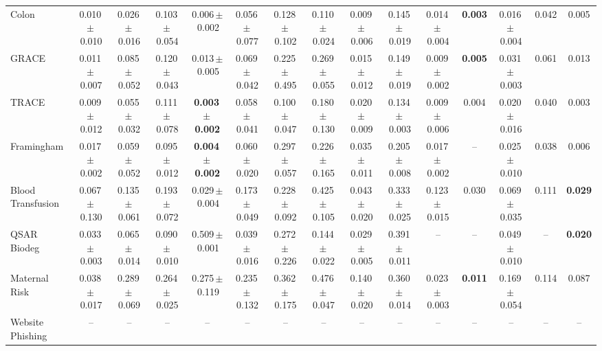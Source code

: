 \documentclass[8pt]{extarticle}
\begin{document}
\begin{longtable}{l*{14}{c}}
Colon & 0.010\,$\pm$\,0.010 & 0.026\,$\pm$\,0.016 & 0.103\,$\pm$\,0.054 & 0.006\,$\pm$\,0.002 & 0.056\,$\pm$\,0.077 & 0.128\,$\pm$\,0.102 & 0.110\,$\pm$\,0.024 & 0.009\,$\pm$\,0.006 & 0.145\,$\pm$\,0.019 & 0.014\,$\pm$\,0.004 & \textbf{0.003} & 0.016\,$\pm$\,0.004 & 0.042 & 0.005 \\
GRACE & 0.011\,$\pm$\,0.007 & 0.085\,$\pm$\,0.052 & 0.120\,$\pm$\,0.043 & 0.013\,$\pm$\,0.005 & 0.069\,$\pm$\,0.042 & 0.225\,$\pm$\,0.495 & 0.269\,$\pm$\,0.055 & 0.015\,$\pm$\,0.012 & 0.149\,$\pm$\,0.019 & 0.009\,$\pm$\,0.002 & \textbf{0.005} & 0.031\,$\pm$\,0.003 & 0.061 & 0.013 \\
TRACE & 0.009\,$\pm$\,0.012 & 0.055\,$\pm$\,0.032 & 0.111\,$\pm$\,0.078 & \textbf{0.003\,$\pm$\,0.002} & 0.058\,$\pm$\,0.041 & 0.100\,$\pm$\,0.047 & 0.180\,$\pm$\,0.130 & 0.020\,$\pm$\,0.009 & 0.134\,$\pm$\,0.003 & 0.009\,$\pm$\,0.006 & 0.004 & 0.020\,$\pm$\,0.016 & 0.040 & 0.003 \\
Framingham & 0.017\,$\pm$\,0.002 & 0.059\,$\pm$\,0.052 & 0.095\,$\pm$\,0.012 & \textbf{0.004\,$\pm$\,0.002} & 0.060\,$\pm$\,0.020 & 0.297\,$\pm$\,0.057 & 0.226\,$\pm$\,0.165 & 0.035\,$\pm$\,0.011 & 0.205\,$\pm$\,0.008 & 0.017\,$\pm$\,0.002 & -- & 0.025\,$\pm$\,0.010 & 0.038 & 0.006 \\
Blood Transfusion & 0.067\,$\pm$\,0.130 & 0.135\,$\pm$\,0.061 & 0.193\,$\pm$\,0.072 & 0.029\,$\pm$\,0.004 & 0.173\,$\pm$\,0.049 & 0.228\,$\pm$\,0.092 & 0.425\,$\pm$\,0.105 & 0.043\,$\pm$\,0.020 & 0.333\,$\pm$\,0.025 & 0.123\,$\pm$\,0.015 & 0.030 & 0.069\,$\pm$\,0.035 & 0.111 & \textbf{0.029} \\
QSAR Biodeg & 0.033\,$\pm$\,0.003 & 0.065\,$\pm$\,0.014 & 0.090\,$\pm$\,0.010 & 0.509\,$\pm$\,0.001 & 0.039\,$\pm$\,0.016 & 0.272\,$\pm$\,0.226 & 0.144\,$\pm$\,0.022 & 0.029\,$\pm$\,0.005 & 0.391\,$\pm$\,0.011 & -- & -- & 0.049\,$\pm$\,0.010 & -- & \textbf{0.020} \\
Maternal Risk & 0.038\,$\pm$\,0.017 & 0.289\,$\pm$\,0.069 & 0.264\,$\pm$\,0.025 & 0.275\,$\pm$\,0.119 & 0.235\,$\pm$\,0.132 & 0.362\,$\pm$\,0.175 & 0.476\,$\pm$\,0.047 & 0.140\,$\pm$\,0.020 & 0.360\,$\pm$\,0.014 & 0.023\,$\pm$\,0.003 & \textbf{0.011} & 0.169\,$\pm$\,0.054 & 0.114 & 0.087 \\
Website Phishing & -- & -- & -- & -- & -- & -- & -- & -- & -- & -- & -- & -- & -- & -- \\
\end{longtable}
\end{document}
